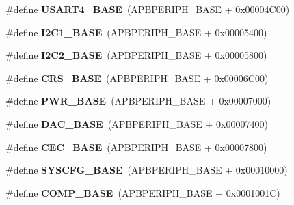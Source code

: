 \begin{DoxyCompactItemize}
\#define {\bfseries U\+S\+A\+R\+T4\+\_\+\+B\+A\+SE}~(A\+P\+B\+P\+E\+R\+I\+P\+H\+\_\+\+B\+A\+SE + 0x00004\+C00)
\item 
\mbox{\label{group___peripheral__memory__map_gacd72dbffb1738ca87c838545c4eb85a3}} 
\#define {\bfseries I2\+C1\+\_\+\+B\+A\+SE}~(A\+P\+B\+P\+E\+R\+I\+P\+H\+\_\+\+B\+A\+SE + 0x00005400)
\item 
\mbox{\label{group___peripheral__memory__map_ga04bda70f25c795fb79f163b633ad4a5d}} 
\#define {\bfseries I2\+C2\+\_\+\+B\+A\+SE}~(A\+P\+B\+P\+E\+R\+I\+P\+H\+\_\+\+B\+A\+SE + 0x00005800)
\item 
\mbox{\label{group___peripheral__memory__map_ga53cd25310ec0663a7395042bd860fedc}} 
\#define {\bfseries C\+R\+S\+\_\+\+B\+A\+SE}~(A\+P\+B\+P\+E\+R\+I\+P\+H\+\_\+\+B\+A\+SE + 0x00006\+C00)
\item 
\mbox{\label{group___peripheral__memory__map_gac691ec23dace8b7a649a25acb110217a}} 
\#define {\bfseries P\+W\+R\+\_\+\+B\+A\+SE}~(A\+P\+B\+P\+E\+R\+I\+P\+H\+\_\+\+B\+A\+SE + 0x00007000)
\item 
\mbox{\label{group___peripheral__memory__map_gad18d0b914c7f68cecbee1a2d23a67d38}} 
\#define {\bfseries D\+A\+C\+\_\+\+B\+A\+SE}~(A\+P\+B\+P\+E\+R\+I\+P\+H\+\_\+\+B\+A\+SE + 0x00007400)
\item 
\mbox{\label{group___peripheral__memory__map_gaacb77bc44b3f8c87ab98f241e760e440}} 
\#define {\bfseries C\+E\+C\+\_\+\+B\+A\+SE}~(A\+P\+B\+P\+E\+R\+I\+P\+H\+\_\+\+B\+A\+SE + 0x00007800)
\item 
\mbox{\label{group___peripheral__memory__map_ga62246020bf3b34b6a4d8d0e84ec79d3d}} 
\#define {\bfseries S\+Y\+S\+C\+F\+G\+\_\+\+B\+A\+SE}~(A\+P\+B\+P\+E\+R\+I\+P\+H\+\_\+\+B\+A\+SE + 0x00010000)
\item 
\mbox{\label{group___peripheral__memory__map_gaa9f5d2999c6918e385d7a526c4f6b1d3}} 
\#define {\bfseries C\+O\+M\+P\+\_\+\+B\+A\+SE}~(A\+P\+B\+P\+E\+R\+I\+P\+H\+\_\+\+B\+A\+SE + 0x0001001\+C)

\end{DoxyCompactItemize}
